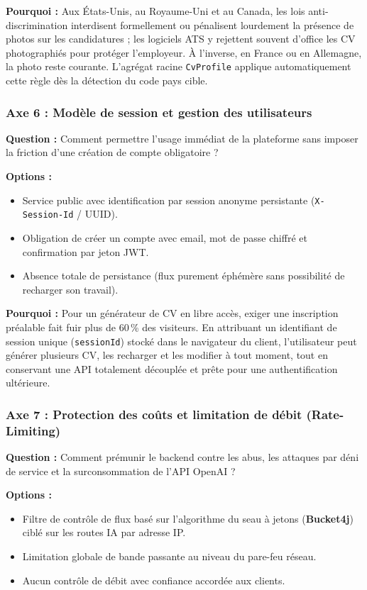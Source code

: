 \documentclass[11pt,a4paper]{article}
\begin{document}
\textbf{Pourquoi :} Aux États-Unis, au Royaume-Uni et au Canada, les lois anti-discrimination interdisent formellement ou pénalisent lourdement la présence de photos sur les candidatures ; les logiciels ATS y rejettent souvent d'office les CV photographiés pour protéger l'employeur. À l'inverse, en France ou en Allemagne, la photo reste courante. L'agrégat racine \texttt{CvProfile} applique automatiquement cette règle dès la détection du code pays cible.

\subsubsection{Axe 6 : Modèle de session et gestion des utilisateurs}
\textbf{Question :} Comment permettre l'usage immédiat de la plateforme sans imposer la friction d'une création de compte obligatoire ?

\textbf{Options :}
\begin{itemize}
    \item[$\boxtimes$] Service public avec identification par session anonyme persistante (\texttt{X-Session-Id} / UUID).
    \item[$\square$] Obligation de créer un compte avec email, mot de passe chiffré et confirmation par jeton JWT.
    \item[$\square$] Absence totale de persistance (flux purement éphémère sans possibilité de recharger son travail).
\end{itemize}

\textbf{Pourquoi :} Pour un générateur de CV en libre accès, exiger une inscription préalable fait fuir plus de 60\,\% des visiteurs. En attribuant un identifiant de session unique (\texttt{sessionId}) stocké dans le navigateur du client, l'utilisateur peut générer plusieurs CV, les recharger et les modifier à tout moment, tout en conservant une API totalement découplée et prête pour une authentification ultérieure.

\subsubsection{Axe 7 : Protection des coûts et limitation de débit (Rate-Limiting)}
\textbf{Question :} Comment prémunir le backend contre les abus, les attaques par déni de service et la surconsommation de l'API OpenAI ?

\textbf{Options :}
\begin{itemize}
    \item[$\boxtimes$] Filtre de contrôle de flux basé sur l'algorithme du seau à jetons (\textbf{Bucket4j}) ciblé sur les routes IA par adresse IP.
    \item[$\square$] Limitation globale de bande passante au niveau du pare-feu réseau.
    \item[$\square$] Aucun contrôle de débit avec confiance accordée aux clients.
\end{itemize}
\end{document}
